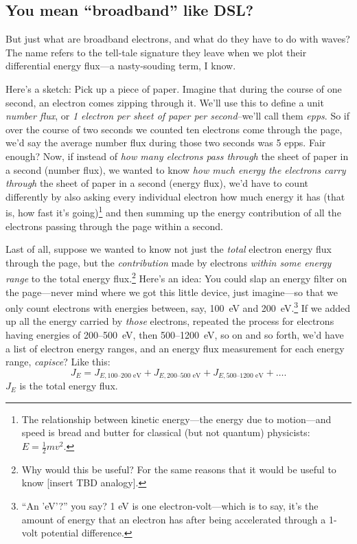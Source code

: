 \subsection{You mean ``broadband'' like DSL?}

But just what are broadband electrons, and what do they have to do
with \Alf waves? The name refers to the tell-tale signature they leave
when we plot their differential energy flux---a nasty-souding term, I
know.

Here's a sketch: Pick up a piece of paper. Imagine that during the
course of one second, an electron comes zipping through it. We'll use
this to define a unit \emph{number flux}, or \emph {1 electron per
  sheet of paper per second}--we'll call them \emph{epps}. So if over
the course of two seconds we counted ten electrons come through the
page, we'd say the average number flux during those two seconds was 5
epps. Fair enough?  Now, if instead of \emph{how many electrons pass
  through} the sheet of paper in a second (number flux), we wanted to
know \emph{how much energy the electrons carry through} the sheet of
paper in a second (energy flux), we'd have to count differently by
also asking every individual electron how much energy it has (that is,
how fast it's going)\footnote{The relationship between kinetic
  energy---the energy due to motion---and speed is bread and butter
  for classical (but not quantum) physicists: $E = \frac{1}{2}m v^2.$}
and then summing up the energy contribution of all the electrons
passing through the page within a second.

Last of all, suppose we wanted to know not just the \emph{total}
electron energy flux through the page, but the \emph{contribution}
made by electrons \emph{within some energy range} to the total energy
flux.\footnote{Why would this be useful?  For the same reasons that it
  would be useful to know [insert TBD analogy].}  Here's an idea: You
could slap an energy filter on the page---never mind where we got this
little device, just imagine---so that we only count electrons with
energies between, say, 100~eV and 200~eV.\footnote{``An 'eV'?''  you
  say? 1 eV is one electron-volt---which is to say, it's the amount of
  energy that an electron has after being accelerated through a 1-volt
  potential difference.} If we added up all the energy carried by
\emph{those} electrons, repeated the process for electrons having
energies of 200--500~eV, then 500--1200~eV, so on and so forth, we'd
have a list of electron energy ranges, and an energy flux measurement
for each energy range, \emph{capisce}? Like this:
\begin{equation}
  \label{ch1:eqeFlux}
  J_{E} = J_{E,\textrm{100--200 eV}} + J_{E,\textrm{200--500 eV}} + J_{E,\textrm{500--1200 eV}} + \dots .
\end{equation}
$J_E$ is the total energy flux.

